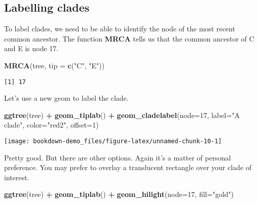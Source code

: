 \documentclass[]{book}
\newenvironment{Shaded}{\begin{snugshade}}{\end{snugshade}}
\newcommand{\KeywordTok}[1]{\textcolor[rgb]{0.13,0.29,0.53}{\textbf{#1}}}
\newcommand{\DataTypeTok}[1]{\textcolor[rgb]{0.13,0.29,0.53}{#1}}
\newcommand{\DecValTok}[1]{\textcolor[rgb]{0.00,0.00,0.81}{#1}}
\newcommand{\StringTok}[1]{\textcolor[rgb]{0.31,0.60,0.02}{#1}}
\newcommand{\OperatorTok}[1]{\textcolor[rgb]{0.81,0.36,0.00}{\textbf{#1}}}
\newcommand{\NormalTok}[1]{#1}
\begin{document}
\subsection{Labelling clades}\label{labelling-clades}

To label clades, we need to be able to identify the node of the most
recent common ancestor. The function \textbf{MRCA} tells us that the
common ancestor of C and E is node 17.

\begin{Shaded}
\begin{Highlighting}[]
\KeywordTok{MRCA}\NormalTok{(tree, }\DataTypeTok{tip =} \KeywordTok{c}\NormalTok{(}\StringTok{"C"}\NormalTok{, }\StringTok{"E"}\NormalTok{))}
\end{Highlighting}
\end{Shaded}

\begin{verbatim}
[1] 17
\end{verbatim}

Let's use a new geom to label the clade.

\begin{Shaded}
\begin{Highlighting}[]
\KeywordTok{ggtree}\NormalTok{(tree) }\OperatorTok{+}\StringTok{ }
\StringTok{  }\KeywordTok{geom_tiplab}\NormalTok{() }\OperatorTok{+}\StringTok{ }
\StringTok{  }\KeywordTok{geom_cladelabel}\NormalTok{(}\DataTypeTok{node=}\DecValTok{17}\NormalTok{, }
                  \DataTypeTok{label=}\StringTok{"A clade"}\NormalTok{, }
                  \DataTypeTok{color=}\StringTok{"red2"}\NormalTok{, }
                  \DataTypeTok{offset=}\DecValTok{1}\NormalTok{)}
\end{Highlighting}
\end{Shaded}

\begin{center}\texttt{[image: bookdown-demo\_files/figure-latex/unnamed-chunk-10-1]} \end{center}

Pretty good. But there are other options. Again it's a matter of
personal preference. You may prefer to overlay a translucent rectangle
over your clade of interest.

\begin{Shaded}
\begin{Highlighting}[]
\KeywordTok{ggtree}\NormalTok{(tree) }\OperatorTok{+}\StringTok{ }
\StringTok{  }\KeywordTok{geom_tiplab}\NormalTok{() }\OperatorTok{+}\StringTok{ }
\StringTok{  }\KeywordTok{geom_hilight}\NormalTok{(}\DataTypeTok{node=}\DecValTok{17}\NormalTok{, }\DataTypeTok{fill=}\StringTok{"gold"}\NormalTok{)}
\end{Highlighting}
\end{Shaded}
\end{document}
